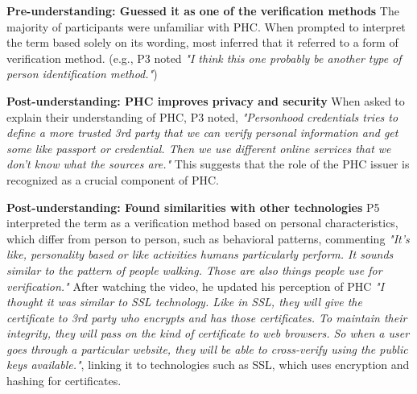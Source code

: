 \textbf{Pre-understanding: Guessed it as one of the verification methods} The majority of participants were unfamiliar with PHC. When prompted to interpret the term based solely on its wording, most inferred that it referred to a form of verification method. (e.g., P3 noted \textit{"I think this one probably be another type of person identification method."})

\textbf{Post-understanding: PHC improves privacy and security} When asked to explain their understanding of PHC, P3 noted, \textit{"Personhood credentials tries to define a more trusted 3rd party that we can verify personal information and get some like passport or credential. Then we use different online services that we don't know what the sources are."} This suggests that the role of the PHC issuer is recognized as a crucial component of PHC.

\textbf{Post-understanding: Found similarities with other technologies} P5 interpreted the term as a verification method based on personal characteristics, which differ from person to person, such as behavioral patterns, commenting \textit{"It's like, personality based or like activities humans particularly perform. It sounds similar to the pattern of people walking. Those are also things people use for verification."} After watching the video, he updated his perception of PHC \textit{"I thought it was similar to SSL technology. Like in SSL, they will give the certificate to 3rd party who encrypts and has those certificates. To maintain their integrity, they will pass on the kind of certificate to web browsers. So when a user goes through a particular website, they will be able to cross-verify using the public keys available."}, linking it to technologies such as SSL, which uses encryption and hashing for certificates.
